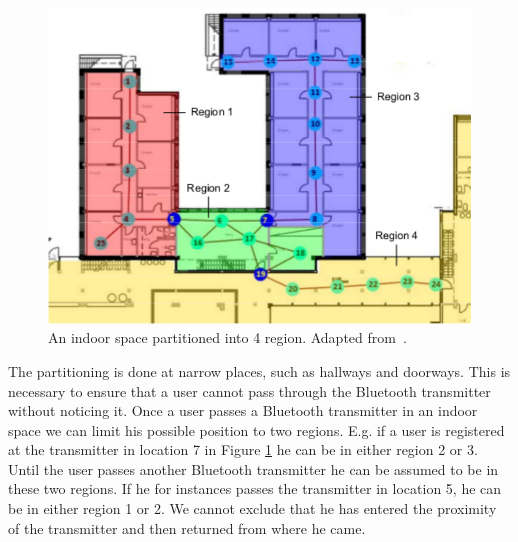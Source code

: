 \begin{figure}%
\includegraphics[width=\columnwidth]{images/partionedcluster}%
\caption{An indoor space partitioned into 4 region. Adapted from~\cite{6068444}.}%
\label{fig:partionedcluster}%
\end{figure}%
The partitioning is done at narrow places, such as hallways and doorways. 
This is necessary to ensure that a user cannot pass through the Bluetooth transmitter without noticing it. 
Once a user passes a Bluetooth transmitter in an indoor space we can limit his possible position to two regions. 
E.g. if a user is registered at the transmitter in location 7 in Figure \ref{fig:partionedcluster} he can be in either region 2 or 3. 
Until the user passes another Bluetooth transmitter he can be assumed to be in these two regions.
If he for instances passes the transmitter in location 5, he can be in either region 1 or 2. 
We cannot exclude that he has entered the proximity of the transmitter and then returned from where he came. 

